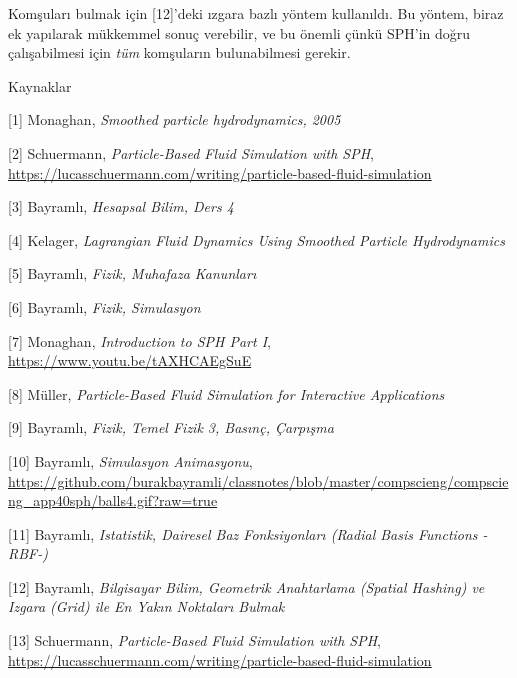 \documentclass[12pt,fleqn]{article}\usepackage{../../common}
\begin{document}
Komşuları bulmak için [12]'deki ızgara bazlı yöntem kullanıldı. Bu yöntem, biraz
ek yapılarak mükkemmel sonuç verebilir, ve bu önemli çünkü SPH'in doğru
çalışabilmesi için {\em tüm} komşuların bulunabilmesi gerekir.


Kaynaklar

[1] Monaghan, {\em Smoothed particle hydrodynamics, 2005}

[2] Schuermann, {\em Particle-Based Fluid Simulation with SPH},
    \url{https://lucasschuermann.com/writing/particle-based-fluid-simulation}

[3] Bayramlı, {\em Hesapsal Bilim, Ders 4}

[4] Kelager, {\em Lagrangian Fluid Dynamics Using Smoothed Particle Hydrodynamics}

[5] Bayramlı, {\em Fizik, Muhafaza Kanunları}

[6] Bayramlı, {\em Fizik, Simulasyon}

[7] Monaghan, {\em Introduction to SPH Part I},
    \url{https://www.youtu.be/tAXHCAEgSuE}

[8] Müller, {\em Particle-Based Fluid Simulation for Interactive Applications}

[9] Bayramlı, {\em Fizik, Temel Fizik 3, Basınç, Çarpışma}

[10] Bayramlı, {\em Simulasyon Animasyonu},
    \url{https://github.com/burakbayramli/classnotes/blob/master/compscieng/compscieng_app40sph/balls4.gif?raw=true}

[11] Bayramlı, {\em Istatistik, Dairesel Baz Fonksiyonları (Radial Basis Functions -RBF-)}

[12] Bayramlı, {\em Bilgisayar Bilim, Geometrik Anahtarlama (Spatial Hashing) ve Izgara (Grid) ile En Yakın Noktaları Bulmak}

[13] Schuermann, {\em Particle-Based Fluid Simulation with SPH},
    \url{https://lucasschuermann.com/writing/particle-based-fluid-simulation}
\end{document}
